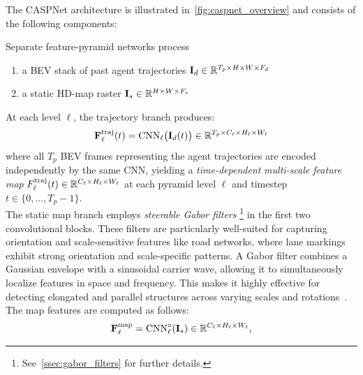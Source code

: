 The CASPNet architecture is illustrated in~\autoref{fig:caspnet_overview} and consists of the following components:
\begin{description}[leftmargin=1em,itemsep=2pt]
\item[Dual FPN encoders.] Separate feature-pyramid networks process
\begin{enumerate}[label=\roman*)]
    \item a BEV stack of past agent trajectories \( \mathbf{I}_d\in\mathbb{R}^{T_p\times H\times W\times F_d} \)
    \item a static HD-map raster \( \mathbf{I}_s\in\mathbb{R}^{H\times W\times F_s} \)
\end{enumerate}

At each level \( \ell \), the trajectory branch produces:
\begin{equation}
\label{eq:fpn_traj}
\mathbf{F}^{\mathrm{traj}}_{\ell}(t) = \mathrm{CNN}_\ell\bigl(\mathbf{I}_{d}(t)\bigr) \in \mathbb{R}^{T_p \times C_\ell \times H_\ell \times W_\ell}
\end{equation}
where all \( T_p \) BEV frames representing the agent trajectories are encoded independently by the same CNN, yielding a \emph{time-dependent} \emph{multi-scale feature map} \( F^{\mathrm{traj}}_{\ell}(t) \in \mathbb{R}^{C_\ell \times H_\ell \times W_\ell} \) at each pyramid level \(\ell\) and timestep \( t \in \{0,\dots,T_p - 1\} \).\\

The static map branch employs \emph{steerable Gabor filters}%
\footnote{See~\autoref{ssec:gabor_filters} for further details.}
in the first two convolutional blocks. These filters are particularly well-suited for capturing orientation and scale-sensitive features like road networks, where lane markings exhibit strong orientation and scale-specific patterns. A Gabor filter combines a Gaussian envelope with a sinusoidal carrier wave, allowing it to simultaneously localize features in space and frequency. This makes it highly effective for detecting elongated and parallel structures across varying scales and rotations~\cite{steerableGaborFilters}.\\
The map features are computed as follows:
\begin{equation}
\label{eq:fpn_map}
\mathbf{F}_{\ell}^{\mathrm{map}}
= \mathrm{CNN}_\ell^{\circ}(\mathbf{I}_s) \in \mathbb{R}^{C_\ell \times H_\ell \times W_\ell},
\end{equation}


\end{description}

